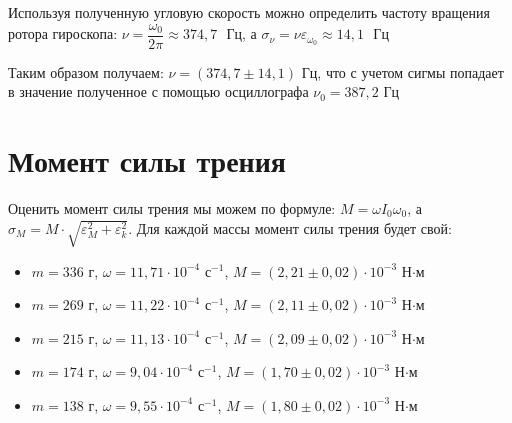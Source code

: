 \documentclass[a4paper,12pt]{article}
\begin{document}
	Используя полученную угловую скорость можно определить частоту вращения ротора гироскопа: $\nu = \dfrac{\omega_0}{2\pi} \approx 374,7\text{ }\text{Гц}$, а $\sigma_{\nu} = \nu\varepsilon_{\omega_0} \approx 14,1\text{ }\text{Гц}$
	
	Таким образом получаем: \underline{$\nu = (374,7\pm14,1)\text{ Гц}$}, что с учетом сигмы попадает в значение полученное с помощью осциллографа $\nu_0 = 387,2\text{ Гц}$
	
	\section{Момент силы трения}
	
	Оценить момент силы трения мы можем по формуле: $M = \omega I_0 \omega_0$, а $\sigma_M = M\cdot\sqrt{\varepsilon_M^2+ \varepsilon_k^2}$. Для каждой массы момент силы трения будет свой:
	
	\begin{itemize}
		\item $m = 336$ г, $\omega = 11,71\cdot 10^{-4}$ $\text{с}^{-1}$, $M = (2,21\pm0,02)\cdot10^{-3}$ Н$\cdot$м
		\item $m = 269$ г, $\omega = 11,22\cdot 10^{-4}$ $\text{с}^{-1}$, $M = (2,11\pm0,02)\cdot10^{-3}$ Н$\cdot$м
		\item $m = 215$ г, $\omega = 11,13\cdot 10^{-4}$ $\text{с}^{-1}$, $M = (2,09\pm0,02)\cdot10^{-3}$ Н$\cdot$м
		\item $m = 174$ г, $\omega = 9,04\cdot 10^{-4}$ $\text{с}^{-1}$, $M = (1,70\pm 0,02)\cdot10^{-3}$ Н$\cdot$м
		\item $m = 138$ г, $\omega = 9,55\cdot 10^{-4}$ $\text{с}^{-1}$, $M = (1,80 \pm 0,02)\cdot10^{-3}$ Н$\cdot$м
	\end{itemize}  

	
\end{document}
